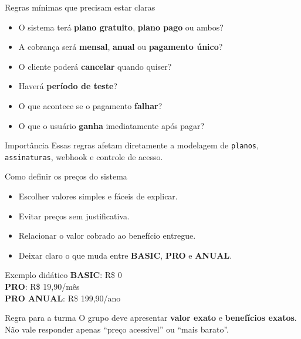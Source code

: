 \documentclass[aspectratio=169]{beamer}
\newcommand{\code}[1]{\texttt{#1}}
\begin{document}
\begin{frame}{Regras mínimas que precisam estar claras}
\begin{itemize}
  \item O sistema terá \textbf{plano gratuito}, \textbf{plano pago} ou ambos?
  \item A cobrança será \textbf{mensal}, \textbf{anual} ou \textbf{pagamento único}?
  \item O cliente poderá \textbf{cancelar} quando quiser?
  \item Haverá \textbf{período de teste}?
  \item O que acontece se o pagamento \textbf{falhar}?
  \item O que o usuário \textbf{ganha} imediatamente após pagar?
\end{itemize}

\begin{exampleblock}{Importância}
Essas regras afetam diretamente a modelagem de \code{planos}, \code{assinaturas}, webhook e controle de acesso.
\end{exampleblock}
\end{frame}

\begin{frame}{Como definir os preços do sistema}
\begin{itemize}
  \item Escolher valores simples e fáceis de explicar.
  \item Evitar preços sem justificativa.
  \item Relacionar o valor cobrado ao benefício entregue.
  \item Deixar claro o que muda entre \textbf{BASIC}, \textbf{PRO} e \textbf{ANUAL}.
\end{itemize}

\begin{block}{Exemplo didático}
\textbf{BASIC}: R\$ 0\\
\textbf{PRO}: R\$ 19,90/mês\\
\textbf{PRO ANUAL}: R\$ 199,90/ano
\end{block}

\begin{alertblock}{Regra para a turma}
O grupo deve apresentar \textbf{valor exato} e \textbf{benefícios exatos}. Não vale responder apenas ``preço acessível'' ou ``mais barato''.
\end{alertblock}
\end{frame}
\end{document}
